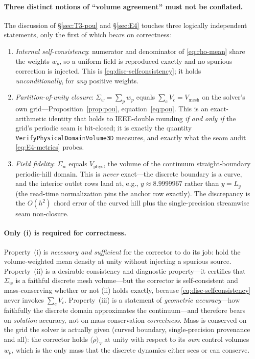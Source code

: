 \documentclass[11pt]{article}
\theoremstyle{definition}
\theoremstyle{remark}
\begin{document}
\paragraph{Three distinct notions of ``volume agreement'' must not be conflated.}
The discussion of \S\ref{sec:T3-pou} and \S\ref{sec:E4} touches three logically
independent statements, only the first of which bears on correctness:
\begin{enumerate}
\item[(i)] \emph{Internal self-consistency}: numerator and denominator of
  \eqref{eq:rho-mean} share the weights $w_p$, so a uniform field is reproduced
  exactly and no spurious correction is injected. This is \eqref{eq:disc-selfconsistency};
  it holds \emph{unconditionally}, for \emph{any} positive weights.
\item[(ii)] \emph{Partition-of-unity closure}:
  $\Sigma_w=\sum_p w_p$ equals $\sum_c V_c=V_{\mathrm{mesh}}$ on the solver's own
  grid---Proposition~\ref{prop:pou}, equation~\eqref{eq:pou}. This is an
  exact-arithmetic identity that holds to IEEE-double rounding \emph{if and only
  if} the grid's periodic seam is bit-closed; it is exactly the quantity
  \texttt{VerifyPhysicalDomainVolume3D} measures, and exactly what the seam audit
  \eqref{eq:E4-metrics} probes.
\item[(iii)] \emph{Field fidelity}: $\Sigma_w$ equals $V_{\mathrm{phys}}$, the
  volume of the continuum straight-boundary periodic-hill domain. This is
  \emph{never} exact---the discrete boundary is a curve, and the
  interior outlet rows land at, e.g., $y\approx 8.9999967$ rather than $y=L_y$
  (the read-time normalization pins the anchor row exactly). The discrepancy is the
  $O(h^2)$ chord error of the curved hill plus the single-precision streamwise
  seam non-closure.
\end{enumerate}

\paragraph{Only (i) is required for correctness.}
Property~(i) is \emph{necessary and sufficient} for the corrector to do its job:
hold the volume-weighted mean density at unity without injecting a spurious
source. Property~(ii) is a desirable consistency and diagnostic property---it
certifies that $\Sigma_w$ is a faithful discrete mesh volume---but the corrector
is self-consistent and mass-conserving whether or not (ii) holds exactly, because
\eqref{eq:disc-selfconsistency} never invokes $\sum_c V_c$. Property~(iii) is a
statement of \emph{geometric accuracy}---how faithfully the discrete domain
approximates the continuum---and therefore bears on \emph{solution} accuracy, not
on mass-conservation \emph{correctness}. Mass is conserved on the grid the solver
is actually given (curved boundary, single-precision provenance and all): the
corrector holds $\langle\rho\rangle_V$ at unity with respect to its \emph{own}
control volumes $w_p$, which is the only mass that the discrete dynamics either
sees or can conserve.
\end{document}

